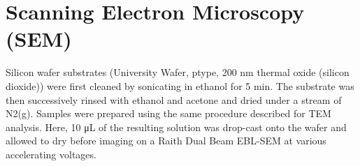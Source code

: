 \documentclass [11pt, proquest] {uwthesis}[2016/11/22]
\begin{document}
\section{Scanning Electron Microscopy (SEM)}

Silicon wafer substrates (University Wafer, ptype, 200 nm thermal oxide (silicon dioxide)) were first cleaned by sonicating in ethanol for 5 min. The substrate was then successively rinsed with ethanol and acetone and dried under a stream of N2(g). Samples were prepared using the same procedure described for TEM analysis. Here, 10 μL of the resulting solution was drop-cast onto the wafer and allowed to dry before imaging on a Raith Dual Beam EBL-SEM at various accelerating voltages.
\end{document}

